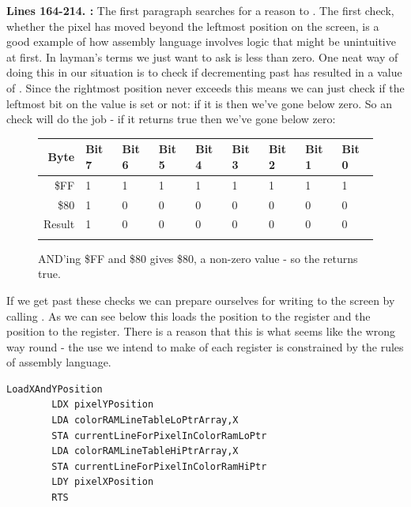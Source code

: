 \textbf{Lines 164-214. :} The first paragraph searches for a reason to . The first
check, whether the pixel has moved beyond the leftmost position on the screen, is a good example of how assembly language involves
logic that might be unintuitive at first. In layman's terms we just want to ask is  less than zero. One neat
way of doing this in our situation is to check if decrementing past  has resulted in a value of . Since
the rightmost position never exceeds  this means we can just check if the leftmost bit on the value is set or not: if 
it is then we've gone below zero. So an  check will do the job - if it returns true then we've gone below zero:

\begin{figure}[H]
  {
    \setlength{\tabcolsep}{3.0pt}
    \setlength\cmidrulewidth{\heavyrulewidth} %
    \begin{adjustbox}{width=7cm,center}

      \begin{tabular}{rllllllll}
        \toprule
        Byte & Bit 7 & Bit 6 & Bit 5 & Bit 4 & Bit 3 & Bit 2 & Bit 1 & Bit 0        \\
        \midrule
        \$FF & 1 & 1 & 1 & 1 & 1 & 1 & 1 & 1 \\
        \$80 & 1 & 0 & 0 & 0 & 0 & 0 & 0 & 0 \\
        \midrule
        Result & 1 & 0 & 0 & 0 & 0 & 0 & 0 & 0 \\
        \addlinespace
        \bottomrule
      \end{tabular}
    \end{adjustbox}
    }\caption*{AND'ing \$FF and \$80 gives \$80, a non-zero value - so the  returns true.}
\end{figure}

If we get past these checks we can prepare ourselves for writing to the screen by calling . As we can
see below this loads the  position to the  register and the  position to the  register. There
is a reason that this is what seems like the wrong way round - the use we intend to make of each register is constrained by the
rules of assembly language.

\begin{lstlisting}
LoadXAndYPosition   
        LDX pixelYPosition
        LDA colorRAMLineTableLoPtrArray,X
        STA currentLineForPixelInColorRamLoPtr
        LDA colorRAMLineTableHiPtrArray,X
        STA currentLineForPixelInColorRamHiPtr
        LDY pixelXPosition
        RTS 
\end{lstlisting}


